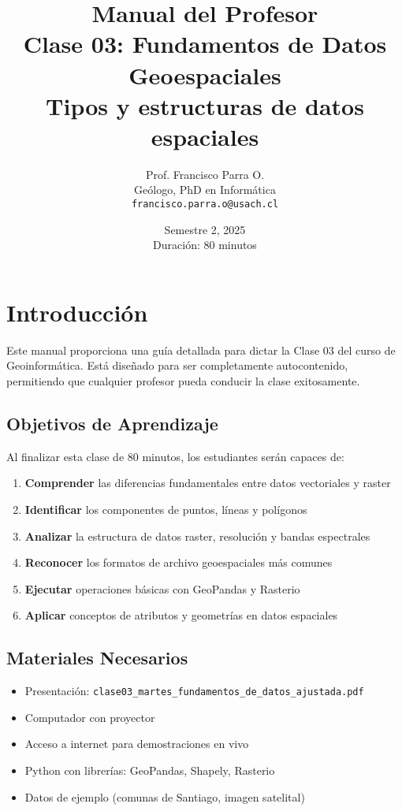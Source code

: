 \documentclass[11pt,a4paper]{article}
\title{{\Huge \textbf{Manual del Profesor}}\\[0.5cm]
{\Large Clase 03: Fundamentos de Datos Geoespaciales}\\[0.3cm]
{\large Tipos y estructuras de datos espaciales}}
\author{Prof. Francisco Parra O.\\
Geólogo, PhD en Informática\\
\texttt{francisco.parra.o@usach.cl}}
\date{Semestre 2, 2025\\
Duración: 80 minutos}
\begin{document}
\maketitle
\thispagestyle{empty}
\newpage

\tableofcontents
\newpage

\section{Introducción}

Este manual proporciona una guía detallada para dictar la Clase 03 del curso de Geoinformática. Está diseñado para ser completamente autocontenido, permitiendo que cualquier profesor pueda conducir la clase exitosamente.

\subsection{Objetivos de Aprendizaje}

Al finalizar esta clase de 80 minutos, los estudiantes serán capaces de:

\begin{enumerate}
    \item \textbf{Comprender} las diferencias fundamentales entre datos vectoriales y raster
    \item \textbf{Identificar} los componentes de puntos, líneas y polígonos
    \item \textbf{Analizar} la estructura de datos raster, resolución y bandas espectrales
    \item \textbf{Reconocer} los formatos de archivo geoespaciales más comunes
    \item \textbf{Ejecutar} operaciones básicas con GeoPandas y Rasterio
    \item \textbf{Aplicar} conceptos de atributos y geometrías en datos espaciales
\end{enumerate}

\subsection{Materiales Necesarios}

\begin{itemize}
    \item Presentación: \texttt{clase03\_martes\_fundamentos\_de\_datos\_ajustada.pdf}
    \item Computador con proyector
    \item Acceso a internet para demostraciones en vivo
    \item Python con librerías: GeoPandas, Shapely, Rasterio
    \item Datos de ejemplo (comunas de Santiago, imagen satelital)
\end{itemize}
\end{document}
